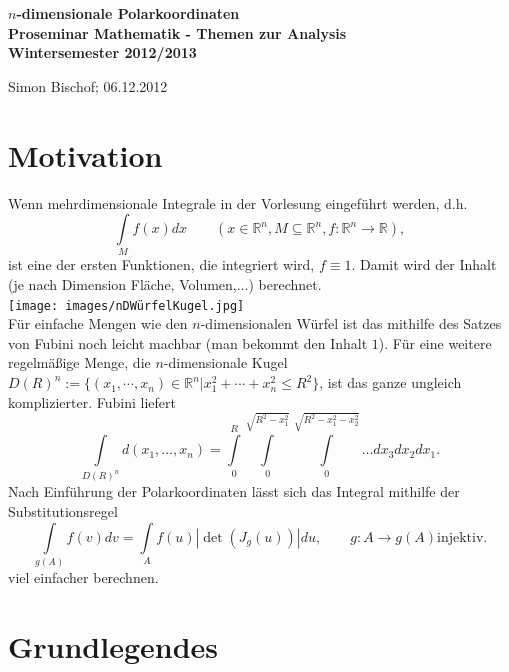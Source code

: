 \documentclass[a4paper,11pt]{scrartcl}
\newcommand{\R}{{\ensuremath{\mathbb{R}}}}
\newcommand{\const}{\ensuremath{\equiv}}
\begin{document}
\begin{titlepage}
	\begin{center}	
		\LARGE \textbf{$n$-dimensionale Polarkoordinaten \\[5ex]
			{\Large Proseminar Mathematik - Themen zur Analysis \\[5ex] 
    		Wintersemester 2012/2013}\\[5ex]}
	\end{center}
	\begin{center}
		Simon Bischof; 06.12.2012
	\end{center}
\end{titlepage}
\clearpage{}
\setcounter{tocdepth}{1}

\clearpage{}
\section{Motivation}
Wenn mehrdimensionale Integrale in der Vorlesung eingeführt werden, d.h.
\begin{equation}
\label{int}
\int\limits_M f(x)dx \qquad (x\in\R^n,M\subseteq \R^n, f:\R^n\to\R),\end{equation}
ist eine der ersten Funktionen, die integriert wird, $f\const 1$. Damit wird der Inhalt (je nach Dimension Fläche, Volumen,$\ldots$) berechnet.\\
\texttt{[image: images/nDWürfelKugel.jpg]}\\
Für einfache Mengen wie den $n$-dimensionalen Würfel ist das mithilfe des Satzes von Fubini noch leicht machbar (man bekommt den Inhalt $1$). Für eine weitere regelmäßige Menge, die $n$-dimensionale Kugel $D(R)^n:=\{(x_1,\cdots,x_n)\in\R^n|x_1^2+\cdots+x_n^2\leq R^2\}$, ist das ganze ungleich komplizierter. Fubini liefert
$$\int\limits_{D(R)^n} d(x_1,\ldots,x_n)= \int\limits_0^R\int\limits_0^{\sqrt{R^2-x_1^2}}\int\limits_0^{\sqrt{R^2-x_1^2-x_2^2}}\ldots dx_3 dx_2 dx_1.$$
Nach Einführung der Polarkoordinaten lässt sich das Integral mithilfe der Substitutionsregel
\begin{equation}
\label{subst}
\int\limits_{g(A)}f(v)dv=\int\limits_A f(u)|\det(J_g(u))| du, \qquad g:A\to g(A) \text{injektiv.}
\end{equation}
viel einfacher berechnen.
\section{Grundlegendes}
\end{document}

